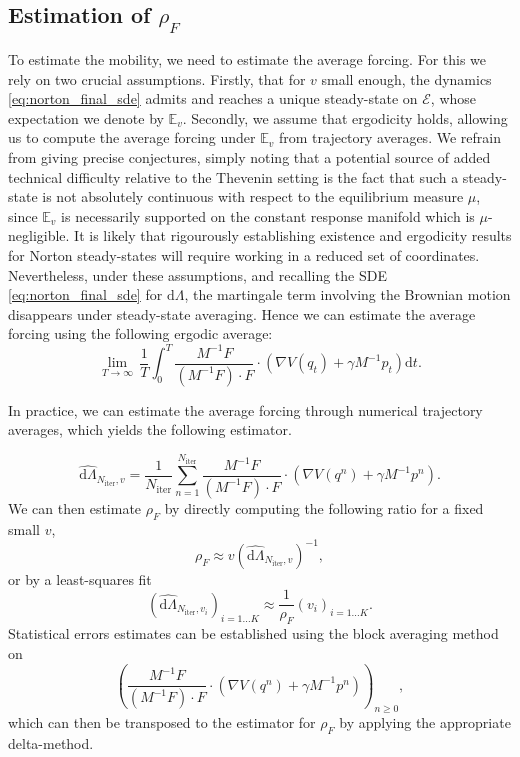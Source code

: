 \documentclass[a4paper,10pt,twoside,leqno]{report}
\newcommand{\E}{\mathbb{E}}
\renewcommand{\geq}{\geqslant}
\newcommand{\dif}{\mathrm{d}}
\newcommand{\1}{\mathbbm{1}}
\begin{document}
    \subsection{Estimation of $\rho_F$}
    To estimate the mobility, we need to estimate the average forcing. For this we rely on two crucial assumptions. Firstly, that for $v$ small enough, the dynamics \eqref{eq:norton_final_sde} admits and reaches a unique steady-state on $\mathcal E$, whose expectation we denote by $\E_v$.
    Secondly, we assume that ergodicity holds, allowing us to compute the average forcing under $\E_v$ from trajectory averages. We refrain from giving precise conjectures, simply noting that a potential source of added technical difficulty relative to the Thevenin setting is the fact that such a steady-state is not absolutely continuous with respect to the equilibrium measure $\mu$, since $\E_v$ is necessarily supported on the constant response manifold which is $\mu$-negligible.
    It is likely that rigourously establishing existence and ergodicity results for Norton steady-states will require working in a reduced set of coordinates.
    Nevertheless, under these assumptions, and recalling the SDE \eqref{eq:norton_final_sde} for $\dif \Lambda$, the martingale term involving the Brownian motion disappears under steady-state averaging.
    Hence we can estimate the average forcing using the following ergodic average:
    \begin{equation}
        \label{eq:norton_ergodic_forcing}
        \underset{T\to\infty}\lim\,\frac{1}T\int_0^T\frac{M^{-1}F}{\left(M^{-1}F\right)\cdot F}\cdot\left(\nabla V(q_t)+\gamma M^{-1}p_t\right)\dif t.
    \end{equation}
    
    In practice, we can estimate the average forcing through numerical trajectory averages, which yields the following estimator.
    
    \begin{equation}
        \widehat{\dif \Lambda}_{N_{\mathrm{iter}},v}=\frac{1}{N_{\mathrm{iter}}}\sum_{n=1}^{N_{\mathrm{iter}}}\frac{M^{-1}F}{\left(M^{-1}F\right)\cdot F}\cdot\left(\nabla V(q^n)+\gamma M^{-1}p^n\right).
    \end{equation}
    We can then estimate $\rho_F$ by directly computing the following ratio for a fixed small $v$,
    \begin{equation}
        \label{eq:norton_rho_F_estimator}
        \rho_F \approx v\left(\widehat{\dif \Lambda}_{N_{\mathrm{iter}},v}\right)^{-1},
    \end{equation}
    or by a least-squares fit 
    \[\left(\widehat{\dif \Lambda}_{N_{\mathrm{iter}},v_i}\right)_{i=1\dots K}\approx\frac{1}{\rho_F}\left(v_i\right)_{i=1\dots K}.\]
    Statistical errors estimates can be established using the block averaging method on
    \[\left(\frac{M^{-1}F}{\left(M^{-1}F\right)\cdot F}\cdot\left(\nabla V(q^n)+\gamma M^{-1}p^n\right)\right)_{n\geq 0},\]
    which can then be transposed to the estimator for $\rho_F$ by applying the appropriate delta-method. 
    
\end{document}
